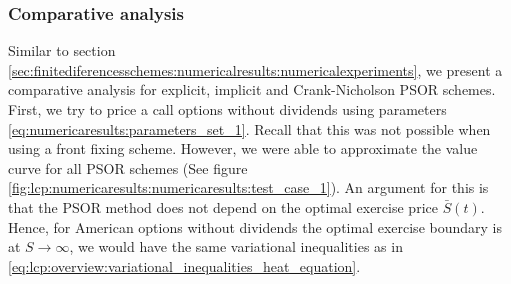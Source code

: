 \subsubsection{Comparative analysis}
Similar to section \eqref{sec:finitediferencesschemes:numericalresults:numericalexperiments}, we present a comparative analysis for explicit, implicit and Crank-Nicholson PSOR schemes. First, we try to price a call options without dividends using parameters \eqref{eq:numericaresults:parameters_set_1}. Recall that this was not possible when using a front fixing scheme. However, we were able to approximate the value curve for all PSOR schemes (See figure \eqref{fig:lcp:numericaresults:numericaresults:test_case_1}). An argument for this is that the PSOR method does not depend on the optimal exercise price $\bar{S}(t)$. Hence, for American options without dividends the optimal exercise boundary is at $S\rightarrow\infty$, we would have the same variational inequalities as in \eqref{eq:lcp:overview:variational_inequalities_heat_equation}.
